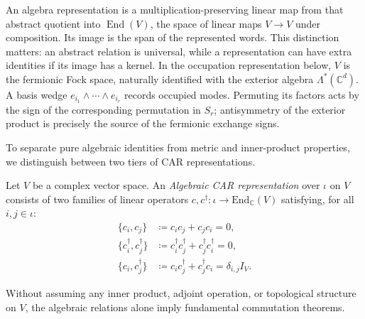 An algebra representation is a multiplication-preserving linear map from that abstract quotient into $\operatorname{End}(V)$, the space of linear maps $V\to V$ under composition. Its image is the span of the represented words. This distinction matters: an abstract relation is universal, while a representation can have extra identities if its image has a kernel. In the occupation representation below, $V$ is the fermionic Fock space, naturally identified with the exterior algebra $\Lambda^*(\mathbb{C}^d)$. A basis wedge $e_{i_1}\wedge\cdots\wedge e_{i_r}$ records occupied modes. Permuting its factors acts by the sign of the corresponding permutation in $S_r$; antisymmetry of the exterior product is precisely the source of the fermionic exchange signs.

To separate pure algebraic identities from metric and inner-product properties, we distinguish between two tiers of CAR representations.

\begin{definition}
Let $V$ be a complex vector space. An \emph{Algebraic CAR representation} over $\iota$ on $V$ consists of two families of linear operators $c, c^\dagger : \iota \to \mathrm{End}_{\mathbb{C}}(V)$ satisfying, for all $i, j \in \iota$:
\begin{align}
\{ c_i, c_j \} &\coloneqq c_i c_j + c_j c_i = 0, \label{eq:car_ann_ann} \\
\{ c_i^\dagger, c_j^\dagger \} &\coloneqq c_i^\dagger c_j^\dagger + c_j^\dagger c_i^\dagger = 0, \label{eq:car_cre_cre} \\
\{ c_i, c_j^\dagger \} &\coloneqq c_i c_j^\dagger + c_j^\dagger c_i = \delta_{i, j} I_V. \label{eq:car_ann_cre}
\end{align}
\end{definition}

Without assuming any inner product, adjoint operation, or topological structure on $V$, the algebraic relations alone imply fundamental commutation theorems.

